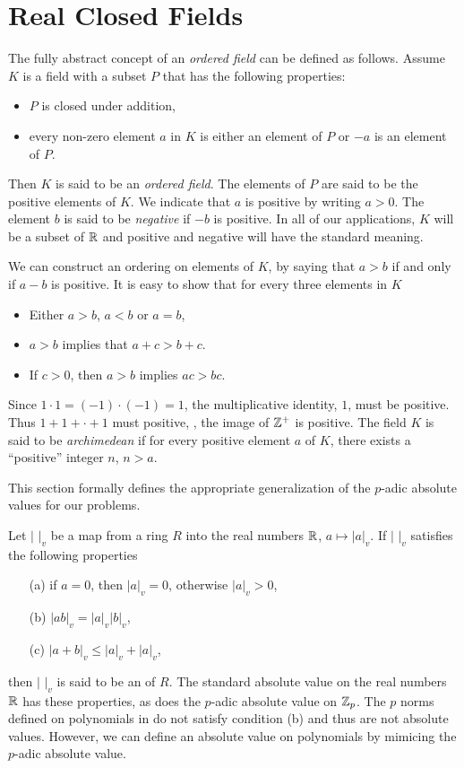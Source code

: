 \chapter{Real Closed Fields}
\label{Real:Chap}

The fully abstract concept of an {\em ordered field} can be defined as
follows.  Assume $K$ is a field with a subset $P$ that has the following
properties:
\begin{itemize}
\item $P$ is closed under addition,
\item every non-zero element $a$ in $K$ is either an element of $P$ or
$-a$ is an element of $P$.
\end{itemize}
Then $K$ is said to be an {\em ordered
field}.  The elements of $P$ are said to be
the positive elements of $K$. We indicate that
$a$ is positive by writing $a > 0$.  The element $b$ is said to be
{\em negative} if $-b$ is positive.  In all of our applications, $K$
will be a subset of $\mathbb{R}$ and positive and negative will have the
standard meaning.  

We can construct an ordering on elements of $K$, by
saying that $a > b$ if and only if $a - b$ is positive.  It is easy to
show that for every three elements in $K$ 
\begin{itemize}
\item Either $a> b$, $a < b$ or $a = b$, 
\item $a > b$ implies that $a + c > b + c$.
\item If $c> 0$, then $a>b$ implies $ac > bc$.
\end{itemize}

Since $1 \cdot 1 = (-1) \cdot (-1) = 1$, the multiplicative identity,
$1$, must be positive.  Thus $1 + 1 + \cdot + 1$ must positive, \ie,
the image of $\mathbb{Z}^{+}$ is positive.  The field $K$ is said to be {\em
archimedean} if for every positive element $a$ of $K$, there exists a
``positive'' integer $n$, $n > a$. 



This section formally defines the
appropriate generalization of the $p$-adic absolute values for our
problems.

Let $|\,\,|_v$ be a map from a ring $R$ into the real numbers $\mathbb{R}$,
$a \mapsto |a|_v$.  If $|\,\,|_v$ satisfies the following properties
\begin{itemize}
\item[(a)] if $a = 0$, then $|a|_v = 0$, otherwise $|a|_v > 0$,
\item[(b)] $|ab|_v = |a|_v |b|_v$,
\item[(c)] $|a + b|_v \le |a|_v + |a|_v$,
\end{itemize}
then $|\,\,|_v$ is said to be an  of $R$.  The
standard absolute value on the real numbers $\mathbb{R}$ has these properties,
as does the $p$-adic absolute value on $\mathbb{Z}_p$.  The $p$ norms defined
on polynomials in  do not satisfy condition (b)
and thus are not absolute values.  However, we can define an absolute
value on polynomials by mimicing the $p$-adic absolute value. 

